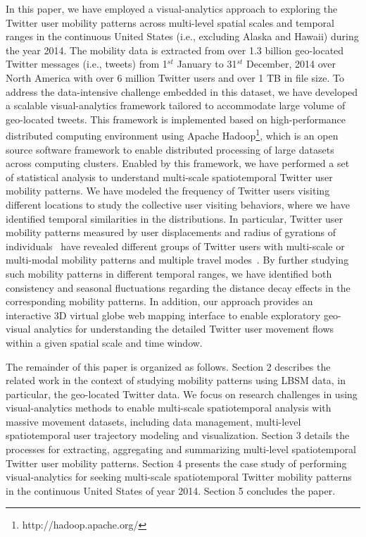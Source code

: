 \documentclass[ijgi,article,submit,moreauthors,pdftex,10pt,a4paper]{mdpi}
\theoremstyle{mdpi}
\newcounter{ex}
\newcounter{re}
\theoremstyle{mdpidefinition}
\begin{document}
In this paper, we have employed a visual-analytics approach to exploring the Twitter user mobility patterns across multi-level spatial scales and temporal ranges in the continuous United States (i.e., excluding Alaska and Hawaii) during the year 2014.
The mobility data is extracted from over 1.3 billion geo-located Twitter messages (i.e., tweets) from 1$^{st}$ January to 31$^{st}$ December, 2014 over North America with over 6 million Twitter users and over 1 TB in file size.
To address the data-intensive challenge embedded in this dataset, we have developed a scalable visual-analytics framework tailored to accommodate large volume of geo-located tweets.
This framework is implemented based on high-performance distributed computing environment using Apache Hadoop\footnote{http://hadoop.apache.org/}, which is an open source software framework to enable distributed processing of large datasets across computing clusters.
Enabled by this framework, we have performed a set of statistical analysis to understand multi-scale spatiotemporal Twitter user mobility patterns. 
We have modeled the frequency of Twitter users visiting different locations to study the collective user visiting behaviors, where we have identified temporal similarities in the distributions.
In particular, Twitter user mobility patterns measured by user displacements and radius of gyrations of individuals~\cite{gonzalez2008understanding} have revealed different groups of Twitter users with multi-scale or multi-modal mobility patterns and multiple travel modes~\cite{Jurdak2015}.
By further studying such mobility patterns in different temporal ranges, we have identified both consistency and seasonal fluctuations regarding the distance decay effects in the corresponding mobility patterns.
In addition, our approach provides an interactive 3D virtual globe web mapping interface to enable exploratory geo-visual analytics for understanding the detailed Twitter user movement flows within a given spatial scale and time window.

The remainder of this paper is organized as follows.
Section 2 describes the related work in the context of studying mobility patterns using LBSM data, in particular, the geo-located Twitter data.
We focus on research challenges in using visual-analytics methods to enable multi-scale spatiotemporal analysis with massive movement datasets, including data management, multi-level spatiotemporal user trajectory modeling and visualization.
Section 3 details the processes for extracting, aggregating and summarizing multi-level spatiotemporal Twitter user mobility patterns.
Section 4 presents the case study of performing visual-analytics for seeking multi-scale spatiotemporal Twitter mobility patterns in the continuous United States of year 2014.
Section 5 concludes the paper.
\end{document}
